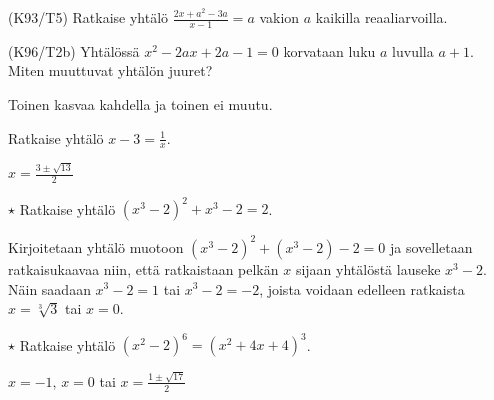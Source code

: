 \begin{tehtavasivu}
\begin{tehtava}
(K93/T5) Ratkaise yhtälö
        $\frac{2x+a^2-3a}{x-1}=a$ vakion $a$ kaikilla reaaliarvoilla.
\begin{vastaus}
    \end{vastaus}
\end{tehtava}

\begin{tehtava}
(K96/T2b) Yhtälössä $x^2-2ax+2a-1=0$ korvataan luku $a$ luvulla $a+1$. Miten muuttuvat yhtälön juuret?
\begin{vastaus}
     Toinen kasvaa kahdella ja toinen ei muutu.
    \end{vastaus}
\end{tehtava}

\begin{tehtava}
Ratkaise yhtälö $x - 3 = \frac{1}{x}$.
    \begin{vastaus}
    $x =\frac{3 \pm \sqrt{13}}{2}$
    \end{vastaus}
\end{tehtava}

\begin{tehtava} %
	$\star$ Ratkaise yhtälö $(x^3-2)^2+x^3-2=2$.
	\begin{vastaus}
		Kirjoitetaan yhtälö muotoon $(x^3-2)^2+(x^3-2)-2=0$ ja sovelletaan ratkaisukaavaa niin, että ratkaistaan pelkän $x$ sijaan yhtälöstä lauseke $x^3-2$. Näin saadaan $x^3-2=1$ tai $x^3-2=-2$, joista voidaan edelleen ratkaista $x=\sqrt[3]{3}$ tai $x=0$.
	\end{vastaus}
\end{tehtava}

\begin{tehtava}
	$\star$ Ratkaise yhtälö $(x^2-2)^6=(x^2+4x+4)^3$.
	\begin{vastaus}
		$x=-1$, $x=0$ tai $x=\frac{1 \pm \sqrt{17}}{2}$
	\end{vastaus}
\end{tehtava}

\end{tehtavasivu}
